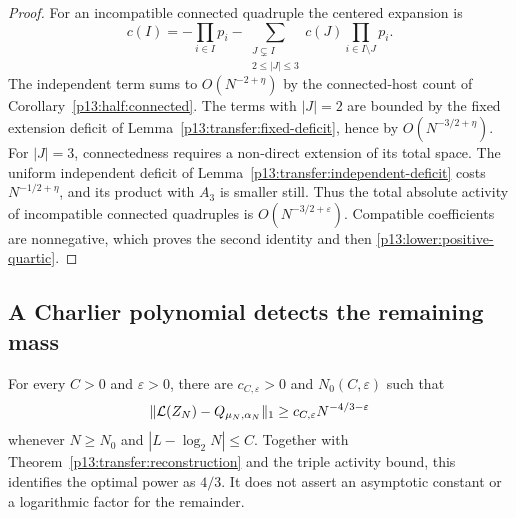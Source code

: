 \begin{proof}
For an incompatible connected quadruple the centered expansion is
\[
 c(I)=-\prod_{i\in I}p_i
       -\sum_{\substack{J\subsetneq I\\2\leq|J|\leq3}}
             c(J)\prod_{i\in I\setminus J}p_i.
\]
The independent term sums to $O(N^{-2+\eta})$ by the connected-host
count of Corollary~\ref{p13:half:connected}. The terms with $|J|=2$ are
bounded by the fixed extension deficit
of Lemma~\ref{p13:transfer:fixed-deficit}, hence by
$O(N^{-3/2+\eta})$. For $|J|=3$, connectedness requires a non-direct
extension of its total space. The uniform independent deficit
of Lemma~\ref{p13:transfer:independent-deficit} costs $N^{-1/2+\eta}$,
and its product with $A_3$ is smaller still. Thus the total absolute
activity of incompatible connected quadruples is $O(N^{-3/2+\varepsilon})$.
Compatible coefficients are nonnegative, which proves the second identity
and then \eqref{p13:lower:positive-quartic}.
\end{proof}

\subsection{A Charlier polynomial detects the remaining mass}

\begin{theorem}
\label{p13:lower:optimal}
For every $C>0$ and $\varepsilon>0$, there are
$c_{C,\varepsilon}>0$ and $N_0(C,\varepsilon)$ such that
\begin{equation}
 \|\mathcal L(Z_N)-Q_{\mu_N,\alpha_N}\|_1
 \geq c_{C,\varepsilon}N^{-4/3-\varepsilon}
 \label{p13:lower:norm}
\end{equation}
whenever $N\geq N_0$ and $|L-\log_2N|\leq C$.
Together with Theorem~\ref{p13:transfer:reconstruction} and the triple
activity bound, this identifies the optimal power as $4/3$.
It does not assert an asymptotic constant or a logarithmic factor for
the remainder.
\end{theorem}

